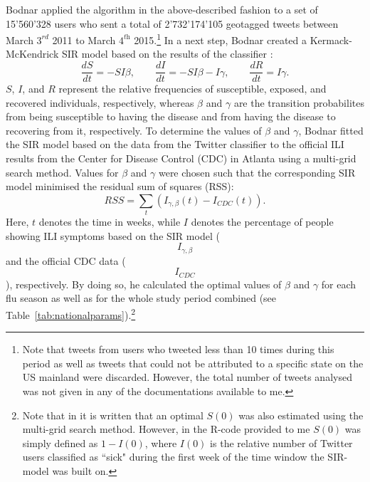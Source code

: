 \documentclass[11pt, a4paper]{report}\usepackage[]{graphicx}\usepackage[]{color}
\begin{document}
Bodnar applied the algorithm in the above-described fashion to a set of 15'560'328 users who sent a total of 2'732'174'105 geotagged tweets between March $3^\textit{rd}$ 2011 to March $4^\textit{th}$ 2015.\footnote{Note that tweets from users who tweeted less than 10 times during this period as well as tweets that could not be attributed to a specific state on the US mainland were discarded. However, the total number of tweets analysed was not given in any of the documentations available to me.} In a next step, Bodnar created a Kermack-McKendrick SIR model based on the results of the classifier \citep{martcheva2015introduction}:
$$\frac{dS}{dt} = -SI\beta, \qquad \frac{dI}{dt} = -SI\beta - I\gamma, \qquad \frac{dR}{dt} = I\gamma.$$
$S$, $I$, and $R$ represent the relative frequencies of susceptible, exposed, and recovered individuals, respectively, whereas $\beta$ and $\gamma$ are the transition probabilites from being susceptible to having the disease and from having the disease to recovering from it, respectively. To determine the values of $\beta$ and $\gamma$, Bodnar fitted the SIR model based on the data from the Twitter classifier to the official ILI results from the Center for Disease Control (CDC) in Atlanta using a multi-grid search method. Values for $\beta$ and $\gamma$ were chosen such that the corresponding SIR model minimised the residual sum of squares (RSS):
$$RSS = \sum_{t}(I_{\gamma,\beta}(t)-I_{CDC}(t)).$$
Here, $t$ denotes the time in weeks, while $I$ denotes the percentage of people showing ILI symptoms based on the SIR model ($$I_{\gamma,\beta}$$ and the official CDC data ($$I_{CDC}$$), respectively. By doing so, he calculated the optimal values of $\beta$ and $\gamma$ for each flu season as well as for the whole study period combined (see Table~\ref{tab:nationalparams}).\footnote{Note that in \citep{bodnar_data_2015} it is written that an optimal $S(0)$ was also estimated using the multi-grid search method. However, in the R-code provided to me $S(0)$ was simply defined as $1-I(0)$, where $I(0)$ is the relative number of Twitter users classified as ``sick" during the first week of the time window the SIR-model was built on.}
\end{document}
